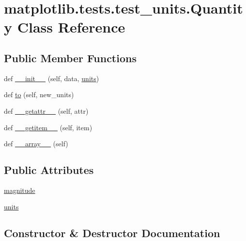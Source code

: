 \hypertarget{classmatplotlib_1_1tests_1_1test__units_1_1Quantity}{}\section{matplotlib.\+tests.\+test\+\_\+units.\+Quantity Class Reference}
\label{classmatplotlib_1_1tests_1_1test__units_1_1Quantity}
\subsection*{Public Member Functions}
\begin{DoxyCompactItemize}
\item 
def \hyperlink{classmatplotlib_1_1tests_1_1test__units_1_1Quantity_ab2e42746508cfb6d878d8b4c90e163d9}{\+\_\+\+\_\+init\+\_\+\+\_\+} (self, data, \hyperlink{classmatplotlib_1_1tests_1_1test__units_1_1Quantity_a0999d152c65b45b1295546aba110d67e}{units})
\item 
def \hyperlink{classmatplotlib_1_1tests_1_1test__units_1_1Quantity_afed177efdd3fabd5d4f3437d73552d80}{to} (self, new\+\_\+units)
\item 
def \hyperlink{classmatplotlib_1_1tests_1_1test__units_1_1Quantity_a15122458bef75879f84b0c6ec223afda}{\+\_\+\+\_\+getattr\+\_\+\+\_\+} (self, attr)
\item 
def \hyperlink{classmatplotlib_1_1tests_1_1test__units_1_1Quantity_aab7748bb2d10ce63e618d71d3337c241}{\+\_\+\+\_\+getitem\+\_\+\+\_\+} (self, item)
\item 
def \hyperlink{classmatplotlib_1_1tests_1_1test__units_1_1Quantity_aeea4976d4efc7affdfd2083e9a28e56a}{\+\_\+\+\_\+array\+\_\+\+\_\+} (self)
\end{DoxyCompactItemize}
\subsection*{Public Attributes}
\begin{DoxyCompactItemize}
\item 
\hyperlink{classmatplotlib_1_1tests_1_1test__units_1_1Quantity_ac667f4d5e140036687cb4599f8a0647f}{magnitude}
\item 
\hyperlink{classmatplotlib_1_1tests_1_1test__units_1_1Quantity_a0999d152c65b45b1295546aba110d67e}{units}
\end{DoxyCompactItemize}


\subsection{Constructor \& Destructor Documentation}
\mbox{\label{classmatplotlib_1_1tests_1_1test__units_1_1Quantity_ab2e42746508cfb6d878d8b4c90e163d9}} 
